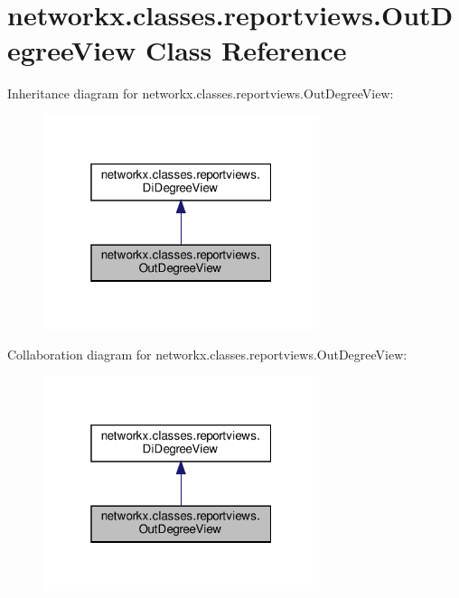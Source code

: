 \hypertarget{classnetworkx_1_1classes_1_1reportviews_1_1OutDegreeView}{}\section{networkx.\+classes.\+reportviews.\+Out\+Degree\+View Class Reference}
\label{classnetworkx_1_1classes_1_1reportviews_1_1OutDegreeView}


Inheritance diagram for networkx.\+classes.\+reportviews.\+Out\+Degree\+View\+:
\nopagebreak
\begin{figure}[H]
\begin{center}
\leavevmode
\includegraphics[width=229pt]{classnetworkx_1_1classes_1_1reportviews_1_1OutDegreeView__inherit__graph}
\end{center}
\end{figure}


Collaboration diagram for networkx.\+classes.\+reportviews.\+Out\+Degree\+View\+:
\nopagebreak
\begin{figure}[H]
\begin{center}
\leavevmode
\includegraphics[width=229pt]{classnetworkx_1_1classes_1_1reportviews_1_1OutDegreeView__coll__graph}
\end{center}
\end{figure}
